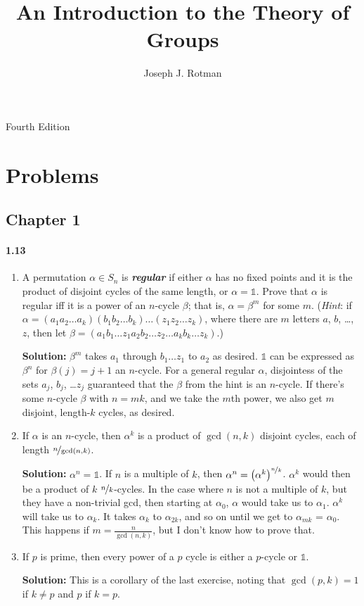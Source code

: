 \documentclass[12pt,a4paper]{article}
\title{An Introduction to the Theory of Groups}
\author{Joseph J. Rotman}
\providecommand{\id}{\mathbb{1}}
\begin{document}
\maketitle
Fourth Edition
\section*{Problems}
\subsection*{Chapter 1}
\paragraph*{1.13}
\begin{enumerate}[label=(\roman*)]
\item A permutation $\alpha \in S_n$ is \textbf{\textit{regular}} if either $\alpha$ has no fixed points and it is the product of disjoint cycles of the same length, or $\alpha = \id$. 
Prove that $\alpha$ is regular iff it is a power of an $n$-cycle $\beta$; that is, $\alpha = \beta^m$ for some $m$. (\textit{Hint}: if $\alpha = (a_1 a_2 \ldots a_k)(b_1 b_2 \ldots b_k)\ldots(z_1 z_2 \ldots z_k)$, where there are $m$ letters $a$, $b$, \ldots, $z$, then let $\beta = (a_1 b_1 \ldots z_1 a_2 b_2 \ldots z_2 \ldots a_k b_k \ldots z_k)$.)

\textbf{Solution: } $\beta^m$ takes $a_1$ through $b_1 \ldots z_1$ to $a_2$ as desired. 
$\id$ can be expressed as $\beta^n$ for $\beta(j) = j+1$ an $n$-cycle. 
For a general regular $\alpha$, disjointess of the sets $a_j$, $b_j$, \ldots $z_j$ guaranteed that the $\beta$ from the hint is an $n$-cycle. 
If there's some $n$-cycle $\beta$ with $n=mk$, and we take the $m$th power, we also get $m$ disjoint, length-$k$ cycles, as desired.
\item If $\alpha$ is an $n$-cycle, then $\alpha^k$ is a product of $\gcd(n, k)$ disjoint cycles, each of length $\nicefrac{n}{\gcd(n, k)}$.

\textbf{Solution:} $\alpha^n = \id$. If $n$ is a multiple of $k$, then $\alpha^n = \left( \alpha^{k} \right)^{\nicefrac{n}{k}}$.
$\alpha^k$ would then be a product of $k$ $\nicefrac{n}{k}$-cycles.
In the case where $n$ is not a multiple of $k$, but they have a non-trivial gcd, then starting at $\alpha_0$, $\alpha$ would take us to $\alpha_1$. 
$\alpha^k$ will take us to $\alpha_k$. 
It takes $\alpha_k$ to $\alpha_{2k}$, and so on until we get to $\alpha_{mk}$ = $\alpha_0$. 
This happens if $m = \frac{n}{\gcd(n,k)}$, but I don't know how to prove that. 
\item If $p$ is prime, then every power of a $p$ cycle is either a $p$-cycle or $\id$.

\textbf{Solution:} This is a corollary of the last exercise, noting that $\gcd(p,k)=1$ if $k \neq p$ and $p$ if $k = p$.
\end{enumerate}
\end{document}
